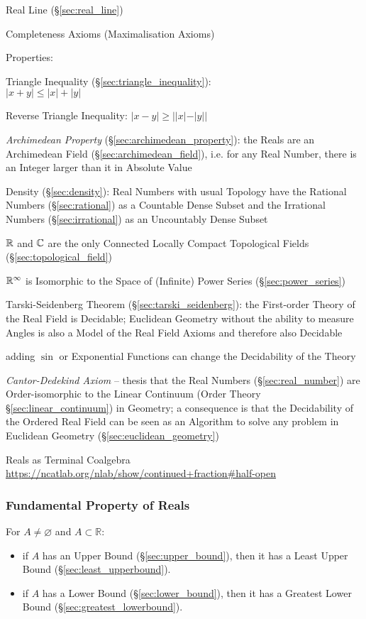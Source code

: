 Real Line (\S\ref{sec:real_line})

Completeness Axioms (Maximalisation Axioms)

Properties:

Triangle Inequality (\S\ref{sec:triangle_inequality}):\\
$|x + y| \leq |x| + |y|$

Reverse Triangle Inequality: $|x - y| \geq ||x| - |y||$

\emph{Archimedean Property} (\S\ref{sec:archimedean_property}): the Reals are
an Archimedean Field (\S\ref{sec:archimedean_field}), i.e. for any Real Number,
there is an Integer larger than it in Absolute Value

Density (\S\ref{sec:density}): Real Numbers with usual Topology have the
Rational Numbers (\S\ref{sec:rational}) as a Countable Dense Subset and the
Irrational Numbers (\S\ref{sec:irrational}) as an Uncountably Dense Subset

$\mathbb{R}$ and $\mathbb{C}$ are the only Connected Locally Compact
Topological Fields (\S\ref{sec:topological_field})

$\mathbb{R}^\infty$ is Isomorphic to the Space of (Infinite) Power Series
(\S\ref{sec:power_series})

Tarski-Seidenberg Theorem (\S\ref{sec:tarski_seidenberg}): the First-order
Theory of the Real Field is Decidable; Euclidean Geometry without the ability
to measure Angles is also a Model of the Real Field Axioms and therefore also
Decidable

adding $\sin$ or Exponential Functions can change the Decidability of the Theory

\emph{Cantor-Dedekind Axiom} -- thesis that the Real Numbers
(\S\ref{sec:real_number}) are Order-isomorphic to the Linear Continuum (Order
Theory \S\ref{sec:linear_continuum}) in Geometry; a consequence is that the
Decidability of the Ordered Real Field can be seen as an Algorithm to solve any
problem in Euclidean Geometry (\S\ref{sec:euclidean_geometry})

Reals as Terminal Coalgebra
\url{https://ncatlab.org/nlab/show/continued+fraction#half-open}



\subsubsection{Fundamental Property of Reals}
\label{sec:fundamental_property}

For $A \neq \varnothing$ and $A \subset \mathbb{R}$:
\begin{itemize}
  \item if $A$ has an Upper Bound (\S\ref{sec:upper_bound}), then it
    has a Least Upper Bound (\S\ref{sec:least_upperbound}).
  \item if $A$ has a Lower Bound (\S\ref{sec:lower_bound}), then it
    has a Greatest Lower Bound (\S\ref{sec:greatest_lowerbound}).
\end{itemize}

